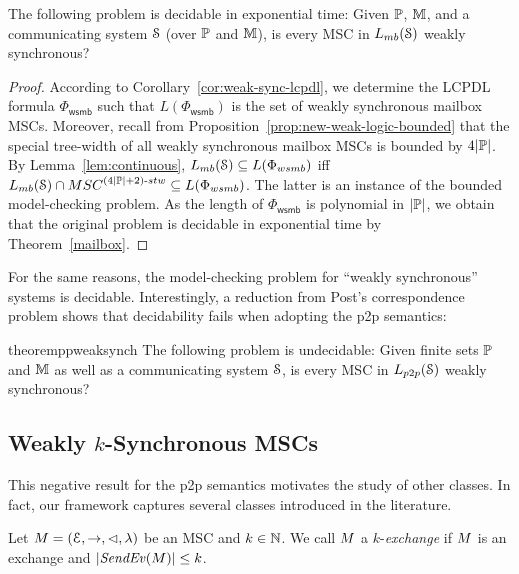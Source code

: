 \documentclass[a4paper,UKenglish,cleveref, autoref, thm-restate]{lipics-v2021}
\begin{document}
\begin{theorem}\label{thm:mailbox-weak-sync}
The following problem is decidable in exponential time:
Given $\mathbb{P}$, $\mathbb{M}$, and a communicating system $\mathcal{S}$ (over $\mathbb{P}$ and $\mathbb{M}$), is every MSC in $\mbL{\System}$ weakly synchronous?
\end{theorem}

\begin{proof}
According to Corollary~\ref{cor:weak-sync-lcpdl},
we determine the LCPDL formula $\Phi_\mathsf{wsmb}$ such
that $L(\Phi_\mathsf{wsmb})$ is the set of weakly synchronous mailbox MSCs. Moreover,
recall from Proposition~\ref{prop:new-weak-logic-bounded} that
the special tree-width of all weakly synchronous mailbox MSCs is bounded by
$4|\mathbb{P}|$.
%
By Lemma~\ref{lem:continuous},
$\mbL{\System} \subseteq L(\Phi_\mathsf{wsmb})$ iff
$\mbL{\System} \cap \stwMSCs{(4|\Procs|+2)} \subseteq L(\Phi_\mathsf{wsmb})$.
The latter is an instance of the bounded model-checking problem.
As the length of $\Phi_\mathsf{wsmb}$ is polynomial in
$|\mathbb{P}|$, we obtain that the original problem is decidable
in exponential time by Theorem~\ref{mailbox}.
\end{proof}

For the same reasons, the model-checking problem for ``weakly
synchronous'' systems is decidable.
%
Interestingly, a reduction from Post's correspondence problem
shows that decidability fails when adopting the p2p semantics:

\begin{restatable}{theorem}{ppweaksynch}\label{thm:p2p-weak-sync}
The following problem is undecidable:
Given finite sets $\mathbb{P}$ and $\mathbb{M}$ as well as a communicating system $\mathcal{S}$,
is every MSC in $\ppL{\System}$ weakly synchronous?
\end{restatable}


\subsection{Weakly $k$-Synchronous MSCs}\label{sec:weakly-k}

This negative result for the p2p semantics motivates the study of other classes.
In fact, our framework captures several classes introduced in the literature.

\begin{definition}[$k$-exchange]\label{def:weak-synchr}
Let $M = (\mathcal{E},\to,\lhd,\lambda)$ be an MSC
and $k \in \mathbb{N}$.
We call $M$ a $k$-\emph{exchange} if
$M$ is an exchange and $|\mathit{SendEv}(M)| \le k$.
\end{definition}
\end{document}
